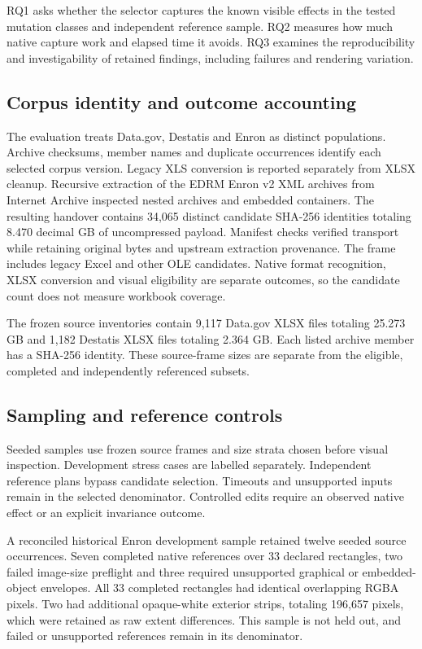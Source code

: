 RQ1 asks whether the selector captures the known visible effects in the tested
mutation classes and independent reference sample. RQ2 measures how much native
capture work and elapsed time it avoids. RQ3 examines the reproducibility and
investigability of retained findings, including failures and rendering variation.

\subsection{Corpus identity and outcome accounting}
The evaluation treats Data.gov, Destatis and Enron as distinct populations.
Archive checksums, member names and duplicate occurrences identify each selected
corpus version. Legacy XLS conversion is reported separately from XLSX cleanup.
Recursive extraction of the EDRM Enron v2 XML archives from Internet Archive
inspected nested archives and embedded containers. The resulting handover
contains 34,065 distinct candidate SHA-256 identities totaling 8.470 decimal GB
of uncompressed payload.
Manifest checks verified transport while retaining original bytes and upstream
extraction provenance. The frame includes legacy Excel and other OLE candidates.
Native format recognition, XLSX conversion and visual eligibility are separate
outcomes, so the candidate count does not measure workbook coverage.

The frozen source inventories contain 9,117 Data.gov XLSX files totaling
25.273 GB and 1,182 Destatis XLSX files totaling 2.364 GB. Each listed archive
member has a SHA-256 identity. These source-frame sizes are separate from the
eligible, completed and independently referenced subsets.

\subsection{Sampling and reference controls}
Seeded samples use frozen source frames and size strata chosen before visual
inspection. Development stress cases are labelled separately. Independent
reference plans bypass candidate selection. Timeouts and unsupported inputs
remain in the selected denominator. Controlled edits require an observed
native effect or an explicit invariance outcome.

A reconciled historical Enron development sample retained twelve seeded source
occurrences. Seven completed native references over 33 declared rectangles,
two failed image-size preflight and three required unsupported graphical or
embedded-object envelopes. All 33 completed rectangles had identical overlapping
RGBA pixels. Two had additional opaque-white exterior strips, totaling 196,657
pixels, which were retained as raw extent differences. This sample is not held
out, and failed or unsupported references remain in its denominator.

